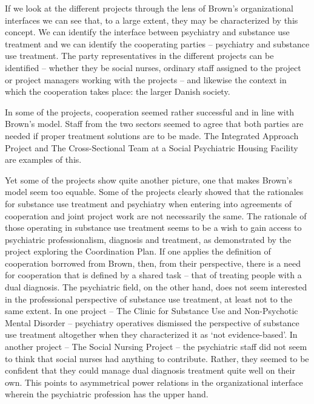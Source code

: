     \begin{multicols}{2}
If we look at the different projects through the lens of Brown’s organizational interfaces we can see that, to a large extent, they may be characterized by this concept. We can identify the interface between psychiatry and substance use treatment and we can identify the cooperating parties – psychiatry and substance use treatment. The party representatives in the different projects can be identified – whether they be social nurses, ordinary staff assigned to the project or project managers working with the projects – and likewise the context in which the cooperation takes place: the larger Danish society.
\par
In some of the projects, cooperation seemed rather successful and in line with Brown’s model. Staff from the two sectors seemed to agree that both parties are needed if proper treatment solutions are to be made. The Integrated Approach Project and The Cross-Sectional Team at a Social Psychiatric Housing Facility are examples of this.
\par
Yet some of the projects show quite another picture, one that makes Brown’s model seem too equable. Some of the projects clearly showed that the rationales for substance use treatment and psychiatry when entering into agreements of cooperation and joint project work are not necessarily the same. The rationale of those operating in substance use treatment seems to be a wish to gain access to psychiatric professionalism, diagnosis and treatment, as demonstrated by the project exploring the Coordination Plan. If one applies the definition of cooperation borrowed from Brown, then, from their perspective, there is a need for cooperation that is defined by a shared task – that of treating people with a dual diagnosis. The psychiatric field, on the other hand, does not seem interested in the professional perspective of substance use treatment, at least not to the same extent. In one project – The Clinic for Substance Use and Non-Psychotic Mental Disorder – psychiatry operatives dismissed the perspective of substance use treatment altogether when they characterized it as ‘not evidence-based’. In another project – The Social Nursing Project – the psychiatric staff did not seem to think that social nurses had anything to contribute. Rather, they seemed to be confident that they could manage dual diagnosis treatment quite well on their own. This points to asymmetrical power relations in the organizational interface wherein the psychiatric profession has the upper hand.
\par

\end{multicols}
